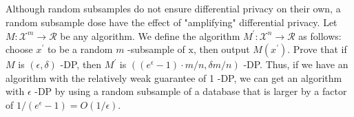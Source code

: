 \documentclass{ctexart}
\begin{document}
\subsection{}
Although random subsamples do not ensure differential privacy on their own, a random subsample dose have the effect of "amplifying" differential privacy. Let $M: \mathcal{X}^{m} \rightarrow \mathcal{R}$ be any algorithm. We define the algorithm $M^{\prime}: \mathcal{X}^{n} \rightarrow \mathcal{R}$ as
follows: choose $x^{\prime}$ to be a random $m$ -subsample of $\mathrm{x}$, then output $M\left(x^{\prime}\right)$. Prove that if $M$ is $(\epsilon, \delta)$ -DP, then $M^{\prime}$ is $\left(\left(e^{\epsilon}-1\right) \cdot m / n, \delta m / n\right)$ -DP. Thus, if we have an algorithm with the relatively weak guarantee of 1 -DP, we can get an algorithm with $\epsilon$ -DP by using a random subsample of a database that is larger by a factor of $1 /\left(e^{\epsilon}-1\right)=O(1 / \epsilon)$.
\end{document}
